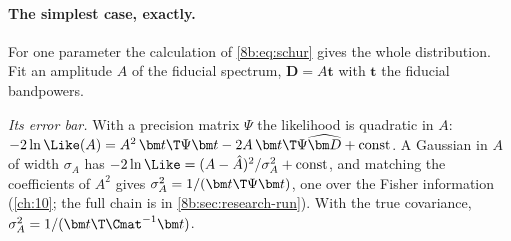\paragraph{The simplest case, exactly.}
For one parameter the calculation of \eqref{8b:eq:schur} gives the whole distribution. Fit an amplitude $A$
of the fiducial spectrum, $\bm D=A\bm t$ with $\bm t$ the fiducial bandpowers.

\emph{Its error bar.} With a precision matrix $\Psi$ the likelihood is quadratic in $A$:
$-2\ln\Like(A)=A^2\,\bm t\T\Psi\bm t-2A\,\bm t\T\Psi\widehat{\bm D}+\text{const}$. A Gaussian in $A$ of width $\sigma_A$ has
$-2\ln\Like=(A-\hat A)^2/\sigma_A^2+\text{const}$, and matching the coefficients of $A^2$ gives
$\sigma_A^2=1/(\bm t\T\Psi\bm t)$, one over the Fisher information (\cref{ch:10}; the full chain is in
\cref{8b:sec:research-run}). With the true covariance, $\sigma_A^2=1/(\bm t\T\Cmat^{-1}\bm t)$.

